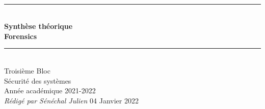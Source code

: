 \documentclass[a4paper]{article}
\newcommand{\HRule}{\rule{\linewidth}{0.5mm}}
\begin{document}
  \begin{titlepage}
    \begin{sffamily}
    \begin{center}
      \textnormal{}\\[6.5cm]
      \HRule \\[0.4cm]
      { \Huge \bfseries Synthèse théorique\\ Forensics\\ [0.4cm] }
      \HRule \\[3cm]
      \Large
      Troisième Bloc\\
      Sécurité des systèmes\\
      Année académique 2021-2022\\[0.2cm]
      \emph{Rédigé par Sénéchal Julien}
      \vfill
      {\large 04 Janvier 2022}
    \end{center}
    \end{sffamily}
  \end{titlepage}

\newpage
\tableofcontents
\newpage
\end{document}
